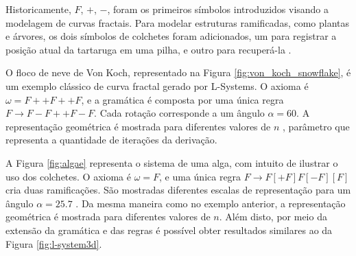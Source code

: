 \vspace{0.5cm}

Historicamente, $F$, $+$, $-$, foram os primeiros símbolos introduzidos visando a modelagem de curvas fractais. Para modelar estruturas ramificadas, como plantas e árvores, os dois símbolos de colchetes foram adicionados, um para registrar a posição atual da tartaruga em uma pilha, e outro para recuperá-la \cite{simon2011}.

O floco de neve de Von Koch, representado na Figura \ref{fig:von_koch_snowflake}, é um exemplo clássico de curva fractal gerado por \gls{L-Systems}. O axioma é $\omega = F ++ F ++ F$, e a gramática é composta por uma única regra $F \rightarrow F - F ++ F - F$. Cada rotação corresponde a um ângulo $\alpha = 60$. A representação geométrica é mostrada para diferentes valores de $n$ \cite{simon2011}, parâmetro que representa a quantidade de iterações da derivação.
	
\begin{figure}[h!]
	\centering
	\captionsetup{width=15cm}
	{}	
\end{figure}

A Figura \ref{fig:algae} representa o sistema de uma alga, com intuito de ilustrar o uso dos colchetes. O axioma é $\omega = F$, e uma única regra $F \rightarrow F [+F] F [-F] [F]$ cria duas ramificações. São mostradas diferentes escalas de representação para um ângulo $\alpha = 25.7$ \cite{simon2011}. Da mesma maneira como no exemplo anterior, a representação geométrica é mostrada para diferentes valores de $n$. Além disto, por meio da extensão da gramática e das regras é possível obter resultados similares ao da Figura \ref{fig:l-system3d}.

\begin{figure}[h!]
	\centering
	\captionsetup{width=15cm}
	{}	
\end{figure}

